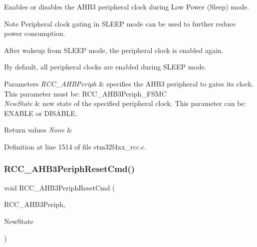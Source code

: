 Enables or disables the A\+H\+B3 peripheral clock during Low Power (Sleep) mode. 

\begin{DoxyNote}{Note}
Peripheral clock gating in S\+L\+E\+EP mode can be used to further reduce power consumption. 

After wakeup from S\+L\+E\+EP mode, the peripheral clock is enabled again. 

By default, all peripheral clocks are enabled during S\+L\+E\+EP mode. 
\end{DoxyNote}

\begin{DoxyParams}{Parameters}
{\em R\+C\+C\+\_\+\+A\+H\+B\+Periph} & specifies the A\+H\+B3 peripheral to gates its clock. This parameter must be\+: R\+C\+C\+\_\+\+A\+H\+B3\+Periph\+\_\+\+F\+S\+MC \\
\hline
{\em New\+State} & new state of the specified peripheral clock. This parameter can be\+: E\+N\+A\+B\+LE or D\+I\+S\+A\+B\+LE. \\
\hline
\end{DoxyParams}

\begin{DoxyRetVals}{Return values}
{\em None} & \\
\hline
\end{DoxyRetVals}


Definition at line 1514 of file stm32f4xx\+\_\+rcc.\+c.

\mbox{\label{group___r_c_c___group3_gaee44f159a1ca9ebdd7117bff387cd592}} 
\subsubsection{\texorpdfstring{R\+C\+C\+\_\+\+A\+H\+B3\+Periph\+Reset\+Cmd()}{RCC\_AHB3PeriphResetCmd()}}
{\footnotesize\ttfamily void R\+C\+C\+\_\+\+A\+H\+B3\+Periph\+Reset\+Cmd (\begin{DoxyParamCaption}\item[{uint32\+\_\+t}]{R\+C\+C\+\_\+\+A\+H\+B3\+Periph,  }\item[{Functional\+State}]{New\+State }\end{DoxyParamCaption})}



